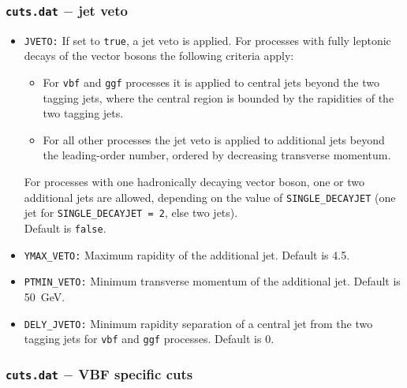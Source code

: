 \documentclass[english,12pt]{article}
\begin{document}
\subsubsection{{\tt cuts.dat} $-$ jet veto}
\begin{itemize}
\item {\tt JVETO:} If set to {\tt true}, a jet veto is applied. For processes with fully leptonic decays of
the vector bosons the following criteria apply: 
\begin{itemize}
\item For {\tt vbf} and {\tt ggf} processes it is applied to central jets beyond the two tagging
jets, where the central region is bounded by the rapidities of the two tagging jets.
\item For all other processes the jet veto is applied to additional jets beyond
the leading-order number, ordered by decreasing transverse momentum.
\end{itemize}
For processes with one hadronically decaying vector boson, one or two additional jets are allowed,
depending on the value of {\tt SINGLE\_DECAYJET} (one jet for {\tt SINGLE\_DECAYJET = 2}, else
two jets).\\
Default is {\tt false}.
\item {\tt YMAX\_VETO:} Maximum rapidity of the additional jet. Default is 4.5.
\item {\tt PTMIN\_VETO:} Minimum transverse momentum of the additional jet. Default is 50~GeV.
\item {\tt DELY\_JVETO:} Minimum rapidity separation of a central jet from the two
tagging jets for {\tt vbf} and {\tt ggf} processes. Default is 0.
\end{itemize}

\subsubsection{{\tt cuts.dat} $-$ VBF specific cuts}
\end{document}
